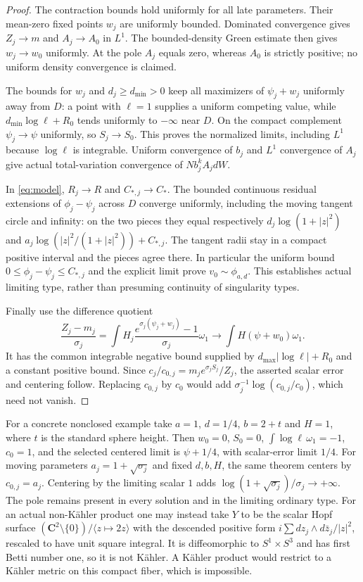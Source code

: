 \documentclass[11pt]{article}
\theoremstyle{remark}\newtheorem{remark}[theorem]{Remark}
\begin{document}
\begin{proof}
The contraction bounds hold uniformly for all late parameters. Their
mean-zero fixed points $w_j$ are uniformly bounded. Dominated convergence
gives $Z_j\to m$ and $A_j\to A_0$ in $L^1$. The bounded-density Green
estimate then gives $w_j\to w_0$ uniformly. At the pole $A_j$ equals zero,
whereas $A_0$ is strictly positive; no uniform density convergence is claimed.

The bounds for $w_j$ and $d_j\geq d_{\min}>0$ keep all maximizers of
$\psi_j+w_j$ uniformly away from $D$: a point with $\ell=1$ supplies a
uniform competing value, while $d_{\min}\log\ell+R_0$ tends uniformly to
$-\infty$ near $D$. On the compact complement $\psi_j\to\psi$ uniformly,
so $S_j\to S_0$. This proves the normalized limits, including $L^1$ because
$\log\ell$ is integrable. Uniform convergence of $b_j$ and $L^1$ convergence
of $A_j$ give actual total-variation convergence of $N b_j^k A_jdW$.

In \eqref{eq:model}, $R_j\to R$ and $C_{*,j}\to C_*$. The bounded continuous
residual extensions of $\phi_j-\psi_j$ across $D$ converge uniformly, including the moving tangent
circle and infinity: on the two pieces they equal respectively
$d_j\log(1+|z|^2)$ and
$a_j\log(|z|^2/(1+|z|^2))+C_{*,j}$.
The tangent radii stay in a compact positive interval and the pieces agree
there. In particular the uniform bound $0\leq\phi_j-\psi_j\leq C_{*,j}$
and the explicit limit prove $v_0\sim\phi_{a,d}$. This establishes actual
limiting type, rather than presuming continuity of singularity types.

Finally use the difference quotient
\[
 \frac{Z_j-m_j}{\sigma_j}
 =\int H_j\frac{e^{\sigma_j(\psi_j+w_j)}-1}{\sigma_j}\omega_1
 \longrightarrow\int H(\psi+w_0)\omega_1.
\]
It has the common integrable negative bound supplied by
$d_{\max}|\log\ell|+R_0$ and a constant positive bound. Since
$c_j/c_{0,j}=m_j e^{\sigma_j S_j}/Z_j$, the asserted scalar error and
centering follow. Replacing $c_{0,j}$ by $c_0$ would add
$\sigma_j^{-1}\log(c_{0,j}/c_0)$, which need not vanish.
\end{proof}

For a concrete nonclosed example take $a=1$, $d=1/4$, $b=2+t$ and $H=1$,
where $t$ is the standard sphere height. Then $w_0=0$, $S_0=0$,
$\int\log\ell\,\omega_1=-1$, $c_0=1$, and the selected centered limit is
$\psi+1/4$, with scalar-error limit $1/4$.
For moving parameters $a_j=1+\sqrt{\sigma_j}$ and fixed $d,b,H$,
the same theorem centers by $c_{0,j}=a_j$. Centering by the limiting scalar
$1$ adds $\log(1+\sqrt{\sigma_j})/\sigma_j\to+\infty$.
The pole remains present in every solution and in the limiting ordinary type.
For an actual non-K\"ahler product one may instead take $Y$ to be the scalar
Hopf surface $(\mathbf C^2\setminus\{0\})/\langle z\mapsto2z\rangle$ with
the descended positive form $i\sum dz_j\wedge d\bar z_j/|z|^2$, rescaled
to have unit square integral. It is diffeomorphic to $S^1\times S^3$ and has
first Betti number one, so it is not K\"ahler. A K\"ahler product would restrict
to a K\"ahler metric on this compact fiber, which is impossible.
\end{document}
